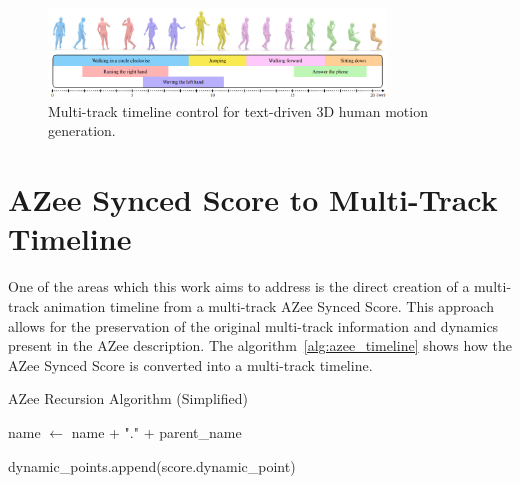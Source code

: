 \documentclass[../../main.tex]{subfiles}
\begin{document}
\begin{figure}
    \centering
    \includegraphics[width=0.8\textwidth]{chapters/multi_track/images/multi_track_other.png}
    \caption{Multi-track timeline control for text-driven 3D human motion generation.}
    \label{fig:multi_track_other}
\end{figure}

\section{AZee Synced Score to Multi-Track Timeline}
\label{ch:multi_track:score_to_timeline}

One of the areas which this work aims to address is the direct creation of a multi-track animation timeline from a multi-track AZee Synced Score. This approach allows for the preservation of the original multi-track information and dynamics present in the AZee description. The algorithm~\ref{alg:azee_timeline} shows how the AZee Synced Score is converted into a multi-track timeline.

\begin{algorithm}
    \caption{AZee Recursion Algorithm (Simplified)}
    \label{alg:azee_timeline}
    \begin{algorithmic}[1]
                \State name $\gets$ name + "." + parent\_name
                \State {}
            \EndIf
            
            \State {}
                \State dynamic\_points.append(score.dynamic\_point)
            \EndIf
            
                \State \Return {}
                    \State {}
                \EndFor
            \Else
                \State \Return {}
            \EndIf
            
                \State {}
            \EndIf
        \EndFunction
    \end{algorithmic}
\end{algorithm}
\end{document}

